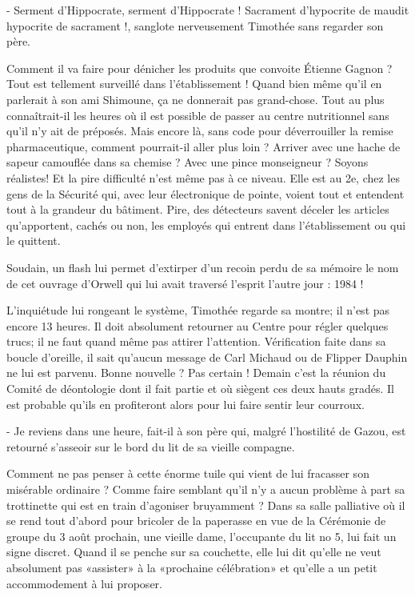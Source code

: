 - Serment d’Hippocrate, serment d’Hippocrate ! Sacrament d’hypocrite de maudit hypocrite de sacrament !, sanglote nerveusement Timothée sans regarder son père.

Comment il va faire pour dénicher les produits que convoite Étienne Gagnon ? Tout est tellement surveillé dans l’établissement ! Quand bien même qu’il en parlerait à son ami Shimoune, ça ne donnerait pas grand-chose. Tout au plus connaîtrait-il les heures où il est possible de passer au centre nutritionnel sans qu’il n’y ait de préposés. Mais encore là, sans code pour déverrouiller la remise pharmaceutique, comment pourrait-il aller plus loin ? Arriver avec une hache de sapeur camouflée dans sa chemise ? Avec une pince monseigneur ? Soyons réalistes! Et la pire difficulté n’est même pas à ce niveau. Elle est au 2e, chez les gens de la Sécurité qui, avec leur électronique de pointe, voient tout et entendent tout à la grandeur du bâtiment. Pire, des détecteurs savent déceler les articles qu’apportent, cachés ou non, les employés qui entrent dans l’établissement ou qui le quittent.

Soudain, un flash lui permet d’extirper d’un recoin perdu de sa mémoire le nom de cet ouvrage d’Orwell qui lui avait traversé l’esprit l’autre jour : 1984 !

L’inquiétude lui rongeant le système, Timothée regarde sa montre; il n’est pas encore 13 heures. Il doit absolument retourner au Centre pour régler quelques trucs; il ne faut quand même pas attirer l’attention. Vérification faite dans sa boucle d’oreille, il sait qu’aucun message de Carl Michaud ou de Flipper Dauphin ne lui est parvenu. Bonne nouvelle ? Pas certain ! Demain c’est la réunion du Comité de déontologie dont il fait partie et où siègent ces deux hauts gradés. Il est probable qu’ils en profiteront alors pour lui faire sentir leur courroux.

- Je reviens dans une heure, fait-il à son père qui, malgré l’hostilité de Gazou, est retourné s’asseoir sur le bord du lit de sa vieille compagne.

Comment ne pas penser à cette énorme tuile qui vient de lui fracasser son misérable ordinaire ? Comme faire semblant qu’il n’y a aucun problème à part sa trottinette qui est en train d’agoniser bruyamment ? Dans sa salle palliative où il se rend tout d’abord pour bricoler de la paperasse en vue de la Cérémonie de groupe du 3 août prochain, une vieille dame, l’occupante du lit no 5, lui fait un signe discret. Quand il se penche sur sa couchette, elle lui dit qu’elle ne veut absolument pas «assister» à la «prochaine célébration» et qu’elle a un petit accommodement à lui proposer.

